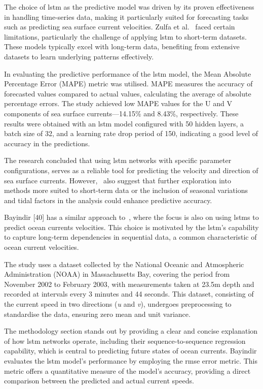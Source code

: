 The choice of \acrshort{lstm} as the predictive model was driven by its proven effectiveness in handling time-series data, making it particularly suited for forecasting tasks such as predicting sea surface current velocities. Zulfa et al.~\cite{43} faced certain limitations, particularly the challenge of applying \acrshort{lstm} to short-term datasets. These models typically excel with long-term data, benefiting from extensive datasets to learn underlying patterns effectively. 

In evaluating the predictive performance of the \acrshort{lstm} model, the Mean Absolute Percentage Error (MAPE) metric was utilised. MAPE measures the accuracy of forecasted values compared to actual values, calculating the average of absolute percentage errors. The study achieved low MAPE values for the U and V components of sea surface currents—14.15\% and 8.43\%, respectively. These results were obtained with an \acrshort{lstm} model configured with 50 hidden layers, a batch size of 32, and a learning rate drop period of 150, indicating a good level of accuracy in the predictions.

The research concluded that using \acrshort{lstm} networks with specific parameter configurations, serves as a reliable tool for predicting the velocity and direction of sea surface currents. However,~\cite{43} also suggest that further exploration into methods more suited to short-term data or the inclusion of seasonal variations and tidal factors in the analysis could enhance predictive accuracy.\newline

Bayindir [40] has a similar approach to~\cite{43}, where the focus is also on using \acrshort{lstm}s to predict ocean currents velocities. This choice is motivated by the \acrshort{lstm}'s capability to capture long-term dependencies in sequential data, a common characteristic of ocean current velocities. 

The study uses a dataset collected by the National Oceanic and Atmospheric Administration (NOAA) in Massachusetts Bay, covering the period from November 2002 to February 2003, with measurements taken at 23.5m depth and recorded at intervals every 3 minutes and 44 seconds. This dataset, consisting of the current speed in two directions (\textit{u} and \textit{v}), undergoes preprocessing to standardise the data, ensuring zero mean and unit variance.

The methodology section stands out by providing a clear and concise explanation of how \acrshort{lstm} networks operate, including their sequence-to-sequence regression capability, which is central to predicting future states of ocean currents. Bayindir evaluates the \acrshort{lstm} model's performance by employing the \acrshort{rmse} error metric. This metric offers a quantitative measure of the model's accuracy, providing a direct comparison between the predicted and actual current speeds. 

